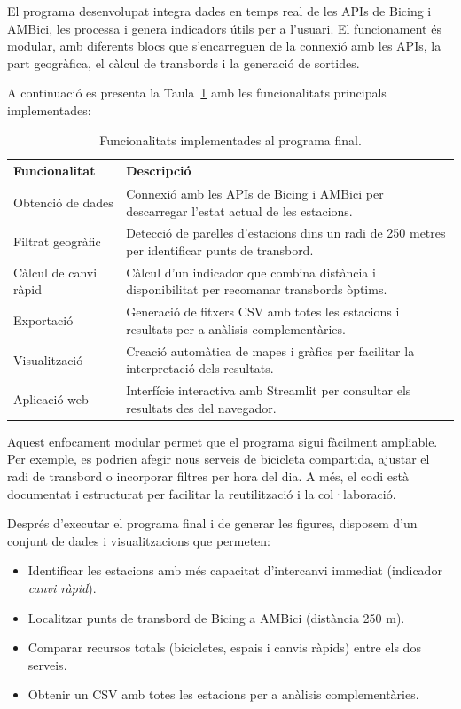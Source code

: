 El programa desenvolupat integra dades en temps real de les APIs de Bicing i AMBici, les processa i genera indicadors útils per a l’usuari. El funcionament és modular, amb diferents blocs que s’encarreguen de la connexió amb les APIs, la part geogràfica, el càlcul de transbords i la generació de sortides.

A continuació es presenta la Taula~\ref{tab:funcionalitats_programa} amb les funcionalitats principals implementades:

\begin{table}[htbp]
\centering
\begin{tabular}{|p{4cm}|p{10cm}|}
\hline
\textbf{Funcionalitat} & \textbf{Descripció} \\
\hline
Obtenció de dades & Connexió amb les APIs de Bicing i AMBici per descarregar l’estat actual de les estacions. \\
\hline
Filtrat geogràfic & Detecció de parelles d’estacions dins un radi de 250 metres per identificar punts de transbord. \\
\hline
Càlcul de canvi ràpid & Càlcul d’un indicador que combina distància i disponibilitat per recomanar transbords òptims. \\
\hline
Exportació & Generació de fitxers CSV amb totes les estacions i resultats per a anàlisis complementàries. \\
\hline
Visualització & Creació automàtica de mapes i gràfics per facilitar la interpretació dels resultats. \\
\hline
Aplicació web & Interfície interactiva amb Streamlit per consultar els resultats des del navegador. \\
\hline
\end{tabular}
\caption{Funcionalitats implementades al programa final.}
\label{tab:funcionalitats_programa}
\end{table}

Aquest enfocament modular permet que el programa sigui fàcilment ampliable. Per exemple, es podrien afegir nous serveis de bicicleta compartida, ajustar el radi de transbord o incorporar filtres per hora del dia. A més, el codi està documentat i estructurat per facilitar la reutilització i la col·laboració.

Després d'executar el programa final i de generar les figures, disposem d'un conjunt de dades i visualitzacions que permeten:
\begin{itemize}
 \item Identificar les estacions amb més capacitat d'intercanvi immediat (indicador \emph{canvi ràpid}).
 \item Localitzar punts de transbord de Bicing a AMBici (distància 250 m).
 \item Comparar recursos totals (bicicletes, espais i canvis ràpids) entre els dos serveis.
 \item Obtenir un CSV amb totes les estacions per a anàlisis complementàries.
\end{itemize}

